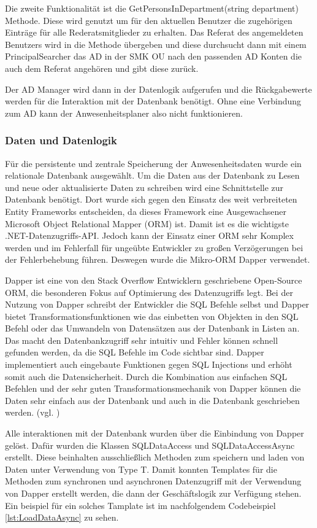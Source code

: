 Die zweite Funktionalität ist die GetPersonsInDepartment(string department) Methode. Diese wird genutzt um für den aktuellen Benutzer die zugehörigen Einträge für alle Rederatsmitglieder zu erhalten. Das Referat des angemeldeten Benutzers wird in die Methode übergeben und diese durchsucht dann mit einem PrincipalSearcher das AD in der SMK OU nach den passenden AD Konten die auch dem Referat angehören und gibt diese zurück.

Der AD Manager wird dann in der Datenlogik aufgerufen und die Rückgabewerte werden für die Interaktion mit der Datenbank benötigt. Ohne eine Verbindung zum AD kann der Anwesenheitsplaner also nicht funktionieren.

\subsubsection{Daten und Datenlogik}
\label{sec:Daten}
Für die persistente und zentrale Speicherung der Anwesenheitsdaten wurde ein relationale Datenbank ausgewählt. Um die Daten aus der Datenbank zu Lesen und neue oder aktualisierte Daten zu schreiben wird eine Schnittstelle zur Datenbank benötigt. Dort wurde sich gegen den Einsatz des weit verbreiteten Entity Frameworks entscheiden, da dieses Framework eine Ausgewachsener Microsoft Object Relational Mapper (ORM) ist. Damit ist es die wichtigste .NET-Datenzugriffs-API. Jedoch kann der Einsatz einer ORM sehr Komplex werden und im Fehlerfall für ungeübte Entwickler zu großen Verzögerungen bei der Fehlerbehebung führen. Deswegen wurde die Mikro-ORM Dapper verwendet.

Dapper ist eine von den Stack Overflow Entwicklern geschriebene Open-Source ORM, die besonderen Fokus auf Optimierung des Datenzugriffs legt. Bei der Nutzung von Dapper schreibt der Entwickler die SQL Befehle selbst und Dapper bietet Transformationsfunktionen wie \zB das einbetten von Objekten in den SQL Befehl oder das Umwandeln von Datensätzen aus der Datenbank in Listen an. Das macht den Datenbankzugriff sehr intuitiv und Fehler können schnell gefunden werden, da die SQL Befehle im Code sichtbar sind. Dapper implementiert auch eingebaute Funktionen gegen SQL Injections und erhöht somit auch die Datensicherheit. Durch die Kombination aus einfachen SQL Befehlen und der sehr guten Transformationsmechanik von Dapper können die Daten sehr einfach aus der Datenbank und auch in die Datenbank geschrieben werden. (vgl. \cite{Dapper})

Alle interaktionen mit der Datenbank wurden über die Einbindung von Dapper gelöst. Dafür wurden die Klassen SQLDataAccess und SQLDataAccessAsync erstellt. Diese beinhalten ausschließlich Methoden zum speichern und laden von Daten unter Verwendung von Type T. Damit konnten Templates für die Methoden zum synchronen und asynchronen Datenzugriff mit der Verwendung von Dapper erstellt werden, die dann der Geschäftslogik zur Verfügung stehen. Ein beispiel für ein solches Tamplate ist im nachfolgendem Codebeispiel \ref{lst:LoadDataAsync} zu sehen.
\\

